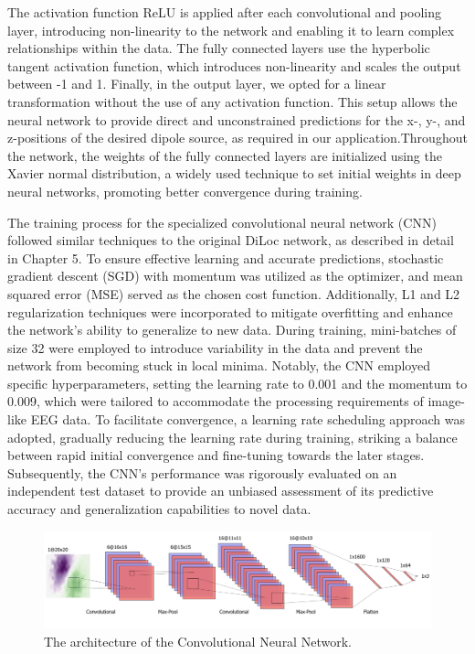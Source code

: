 \documentclass[a4paper, UKenglish, 11pt]{uiomaster}
\begin{document}
The activation function ReLU is applied after each convolutional and pooling layer, introducing non-linearity to the network and enabling it to learn complex relationships within the data. The fully connected layers use the hyperbolic tangent activation function, which introduces non-linearity and scales the output between -1 and 1. Finally, in the output layer, we opted for a linear transformation without the use of any activation function. This setup allows the neural network to provide direct and unconstrained predictions for the x-, y-, and z-positions of the desired dipole source, as required in our application.Throughout the network, the weights of the fully connected layers are initialized using the Xavier normal distribution, a widely used technique to set initial weights in deep neural networks, promoting better convergence during training.

The training process for the specialized convolutional neural network (CNN) followed similar techniques to the original DiLoc network, as described in detail in Chapter 5. To ensure effective learning and accurate predictions, stochastic gradient descent (SGD) with momentum was utilized as the optimizer, and mean squared error (MSE) served as the chosen cost function. Additionally, L1 and L2 regularization techniques were incorporated to mitigate overfitting and enhance the network's ability to generalize to new data. During training, mini-batches of size 32 were employed to introduce variability in the data and prevent the network from becoming stuck in local minima. Notably, the CNN employed specific hyperparameters, setting the learning rate to 0.001 and the momentum to 0.009, which were tailored to accommodate the processing requirements of image-like EEG data. To facilitate convergence, a learning rate scheduling approach was adopted, gradually reducing the learning rate during training, striking a balance between rapid initial convergence and fine-tuning towards the later stages. Subsequently, the CNN's performance was rigorously evaluated on an independent test dataset to provide an unbiased assessment of its predictive accuracy and generalization capabilities to novel data.

\begin{figure}[!htb]
    \hspace*{-3cm} %
    \centering
    \includegraphics[scale=0.52]{figures/CNN.png}
    \caption{The architecture of the Convolutional Neural Network.}
    \label{fig:architecture_CNN}
\end{figure}
\end{document}
